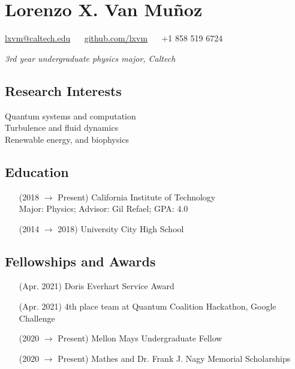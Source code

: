 \documentclass{article}
\begin{document}
{\centering

\section*{Lorenzo X. Van Muñoz}

\href{mailto:lxvm@caltech.edu}{lxvm@caltech.edu}
$\quad$
\href{https://github.com/lxvm}{github.com/lxvm}
$\quad$
+1 858 519 6724

\textit{3rd year undergraduate physics major, Caltech}

}


\begin{multicols}{2}

\subsection*{Research Interests}

\noindent Quantum systems and computation \\
\noindent Turbulence and fluid dynamics \\
\noindent Renewable energy, and biophysics


\subsection*{Education}

\begin{enumerate}
    \item [(2018 $\to$ Present)] California Institute of Technology \\
        Major: Physics; Advisor: Gil Refael; GPA: 4.0
    \item [(2014 $\to$ 2018)] University City High School
\end{enumerate}

\end{multicols}


\subsection*{Fellowships and Awards}

\begin{enumerate}
    \item [(Apr. 2021)] Doris Everhart Service Award
    \item [(Apr. 2021)] 4th place team at Quantum Coalition Hackathon, Google Challenge
    \item [(2020 $\to$ Present)] Mellon Mays Undergraduate Fellow
    \item [(2020 $\to$ Present)] Mathes and Dr. Frank J. Nagy Memorial Scholarships
\end{enumerate}
\end{document}
